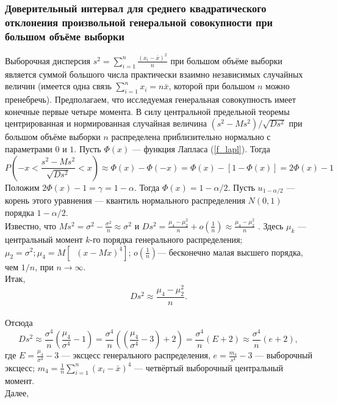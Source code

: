 \documentclass[../body.tex]{subfiles}
\begin{document}
\subsubsection{Доверительный интервал для среднего квадратического отклонения произвольной генеральной совокупности при большом объёме выборки}
Выборочная дисперсия $s^{2} = \sum_{i = 1}^{n}{\frac{(x_{i} - \bar{x})^{2}}{n}}$ при большом объёме выборки является суммой большого числа практически взаимно независимых случайных величин (имеется одна связь $\sum_{i=1}^{n}{x_{i}} = n\bar{x}$, которой при большом $n$ можно пренебречь). Предполагаем, что исследуемая генеральная совокупность имеет конечные первые четыре момента.
\newline
В силу центральной предельной теоремы центрированная и нормированная случайная величина $(s^{2}-Ms^{2})/\sqrt{Ds^{2}}$ при большом объёме выборки $n$ распределена приблизительно нормально с параметрами $0$ и $1$. Пусть $\Phi(x)$ — функция Лапласа (\ref{f_lapl}). Тогда
\begin{equation}
	P\left(-x < \frac{s^{2}-Ms^{2}}{\sqrt{Ds^{2}}} < x\right)
	\approx \Phi(x) - \Phi(-x)=\Phi(x) - [1 - \Phi(x)] = 2\Phi(x) - 1
	\label{P_as_sigma}
\end{equation}
Положим $2\Phi(x)-1 = \gamma = 1-\alpha$. Тогда $\Phi(x) = 1-\alpha/2$. Пусть $u_{1-\alpha/2}$ — корень этого уравнения — квантиль нормального распределения $N(0,1)$ порядка $1-\alpha/2$.\\ Известно, что $Ms^{2} = \sigma^{2} -\frac{\sigma^{2}}{n} \approx \sigma^{2} \text{ и } Ds^{2} = \frac{\mu_{4} -\mu_{2}^{2}}{n} + o(\frac{1}{n}) \approx \frac{\mu_{4} -\mu_{2}^{2}}{n}$ . Здесь $\mu_{k}$ — центральный момент $k$-го порядка генерального распределения; $\mu_{2} = \sigma^{2}; \mu_{4} = M[︀(x-Mx)^{4}]$︀; $o(\frac{1}{n})$︂— бесконечно малая высшего порядка, чем $1/n$, при $n\rightarrow \infty$. \\Итак, $$Ds^{2} \approx \frac{\mu_{4} -\mu_{2}^{2}}{n}.$$\\ Отсюда
\begin{equation}
	Ds^{2} \approx \frac{\sigma^{4}}{n}(\frac{\mu_{4}}{\sigma^{4}} - 1) = 
	\frac{\sigma^{4}}{n}((\frac{\mu_{4}}{\sigma^{4}} - 3) + 2) = \frac{\sigma^{4}}{n}(E + 2) \approx \frac{\sigma^{4}}{n}(e + 2),
	\label{Ds_2}
\end{equation}
где $E = \frac{\mu_{4}}{\sigma^{4}} - 3$ — эксцесс генерального распределения, $e = \frac{m_{4}}{s^{4}} - 3$ — выборочный эксцесс; $m_{4} = \frac{1}{n}\sum_{i =1}^{n}{(x_{i} - \bar{x})^{4}}$  — четвёртый выборочный центральный момент.\\ Далее,
\end{document}
